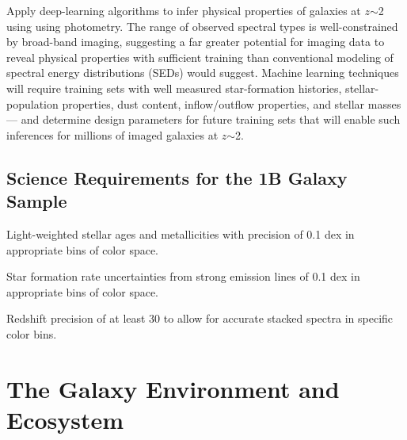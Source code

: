 \documentclass[11pt,a4paper,twoside,onecolumn,openany,final,oldfontcommands]{memoir}
\begin{document}
Apply deep-learning algorithms to infer physical properties of galaxies at $z$$\sim$2 using using photometry. The range of observed spectral types is well-constrained by broad-band imaging, suggesting a far greater potential for imaging data to reveal physical properties with sufficient training than conventional modeling of spectral energy distributions (SEDs) would suggest.  Machine learning techniques will require training sets with well measured star-formation histories, stellar-population properties, dust content, inflow/outflow properties, and stellar masses --- and determine design parameters for future training sets that will enable such inferences for millions of imaged galaxies at $z$$\sim$2. 

\subsection{Science Requirements for the 1B Galaxy Sample}

\begin{sciencerequirement}

\reqitem Light-weighted stellar ages and metallicities with precision of 0.1 dex in appropriate bins of color space.

\reqitem Star formation rate uncertainties from strong emission lines of 0.1 dex in appropriate bins of color space.

\reqitem Redshift precision of at least 30 \kms{} to allow for accurate stacked spectra in specific color bins.

\end{sciencerequirement}


\section{The Galaxy Environment and Ecosystem}
\label{sci:ecosystem}
\end{document}
